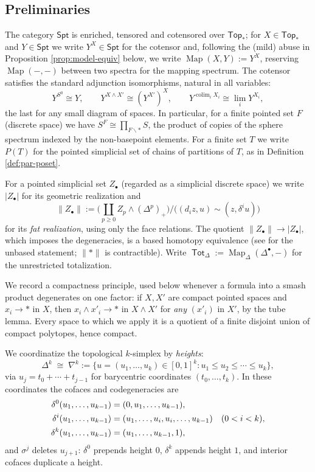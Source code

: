 \documentclass[12pt]{amsart}
\theoremstyle{definition}
\theoremstyle{remark}
\newcommand{\Top}{\mathsf{Top}_*}
\newcommand{\Spt}{\mathsf{Spt}}
\newcommand{\Tot}{\operatorname{\mathsf{Tot}}}
\newcommand{\Map}{\operatorname{Map}}
\newcommand{\colim}{\operatorname{colim}}
\newcommand{\fat}[1]{\lVert #1 \rVert}           %
\newcommand{\basept}{\ast}
\begin{document}
\subsection{Preliminaries}\label{sec:cotensors} The category $\Spt$ is enriched, tensored and cotensored over $\Top$; for $X\in \Top$ and $Y\in \Spt$ we write $Y^{X}\in \Spt$ for the cotensor and, following the (mild) abuse in Proposition \ref{prop:model-equiv} below, we write $\Map(X, Y) := Y^{X}$, reserving $\Map(-,-)$ between two spectra for the mapping spectrum. The cotensor satisfies the standard adjunction isomorphisms, natural in all variables:
\begin{equation}\label{eq:cotensor}
    Y^{S^{0}} \cong Y, \quad\quad Y^{X\wedge X'} \cong (Y^{X'})^{X}, \quad\quad Y^{\colim_i X_i} \cong \lim_i Y^{X_i},
\end{equation}
the last for any small diagram of spaces. In particular, for a finite pointed set $F$ (discrete space) we have $S^{F}\cong \prod_{F\smallsetminus \basept} S$, the product of copies of the sphere spectrum indexed by the non-basepoint elements. For a finite set $T$ we write $P(T)$ for the pointed simplicial set of chains of partitions of $T$, as in Definition \ref{def:par-poset}.

For a pointed simplicial set $Z_{\bullet}$ (regarded as a simplicial discrete space) we write $|Z_{\bullet}|$ for its geometric realization and
\[ \fat{Z_{\bullet}} := \Big( \coprod_{p\geq 0} Z_p \wedge (\Delta^{p})_{+} \Big) \Big/ \big( (d_i z, u) \sim (z, \delta^i u) \big) \]
for its \emph{fat realization}, using only the face relations. The quotient $\fat{Z_{\bullet}}\to |Z_{\bullet}|$, which imposes the degeneracies, is a based homotopy equivalence (see \cite[Appendix A]{Segal-cat-coh} for the unbased statement; $\fat{\basept}$ is contractible). Write $\Tot_{\Delta} := \Map_{\Delta}(\Delta^{\bullet},-)$ for the unrestricted totalization.

We record a compactness principle, used below whenever a formula into a smash product degenerates on one factor: if $X, X'$ are compact pointed spaces and $x_i \to \basept$ in $X$, then $x_i \wedge x'_i \to \basept$ in $X\wedge X'$ for \emph{any} $(x'_i)$ in $X'$, by the tube lemma. Every space to which we apply it is a quotient of a finite disjoint union of compact polytopes, hence compact.

We coordinatize the topological $k$-simplex by \emph{heights}:
\[ \Delta^k \;\cong\; \nabla^k := \{ u=(u_1,\dots,u_k) \in [0,1]^k : u_1\leq u_2\leq \cdots \leq u_k \},\]
via $u_j = t_0+\cdots+t_{j-1}$ for barycentric coordinates $(t_0,\dots,t_k)$. In these coordinates the cofaces and codegeneracies are
\begin{align}
    \delta^0(u_1,\dots,u_{k-1}) &= (0, u_1,\dots,u_{k-1}), \notag \\
    \delta^i(u_1,\dots,u_{k-1}) &= (u_1,\dots,u_i,u_i,\dots,u_{k-1}) \quad (0<i<k), \label{eq:heights-cofaces}\\
    \delta^k(u_1,\dots,u_{k-1}) &= (u_1,\dots,u_{k-1}, 1), \notag
\end{align}
and $\sigma^{j}$ deletes $u_{j+1}$: $\delta^0$ prepends height $0$, $\delta^k$ appends height $1$, and interior cofaces duplicate a height.
\end{document}
